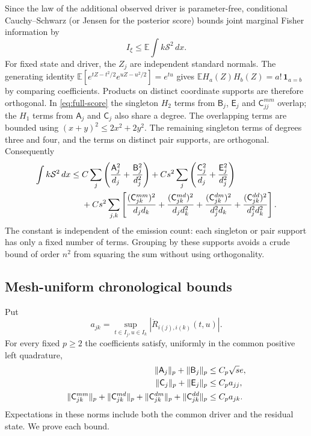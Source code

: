 \documentclass[11pt,a4paper]{amsart}
\theoremstyle{plain}
\theoremstyle{definition}
\theoremstyle{remark}
\newcommand{\EE}{\mathbb{E}}
\begin{document}
Since the law of the additional observed driver is parameter-free,
conditional Cauchy--Schwarz (or Jensen for the posterior score) bounds joint marginal Fisher
information by
\begin{equation}\label{eq:score-Jensen}
 I_\xi\le\EE\int k\mathcal S^2\,dx.
\end{equation}
For fixed state and driver, the $Z_j$ are independent standard normals.
The generating identity
$\EE[e^{tZ-t^2/2}e^{uZ-u^2/2}]=e^{tu}$ gives
$\EE H_a(Z)H_b(Z)=a!\,\mathbf1_{a=b}$ by comparing coefficients.
Products on distinct coordinate supports are therefore orthogonal.
In \eqref{eq:full-score} the singleton $H_2$ terms from
$\mathsf B_j$, $\mathsf E_j$ and $\mathsf C^{mm}_{jj}$ overlap; the
$H_1$ terms from $\mathsf A_j$ and $\mathsf C_j$ also share a degree.
The overlapping terms are bounded using $(x+y)^2\le2x^2+2y^2$.
The remaining singleton terms of degrees three and four, and the terms
on distinct pair supports, are orthogonal.
Consequently
\begin{align}\label{eq:score-norm}
 \int k\mathcal S^2\,dx\le{}&
 C\sum_j\left(\frac{\mathsf A_j^2}{d_j}
                         +\frac{\mathsf B_j^2}{d_j^2}\right)
 +Cs^2\sum_j\left(\frac{\mathsf C_j^2}{d_j}
                         +\frac{\mathsf E_j^2}{d_j^2}\right)\notag\\
 &+Cs^2\sum_{j,k}\left[
 \frac{(\mathsf C^{mm}_{jk})^2}{d_jd_k}
 +\frac{(\mathsf C^{md}_{jk})^2}{d_jd_k^2}
 +\frac{(\mathsf C^{dm}_{jk})^2}{d_j^2d_k}
 +\frac{(\mathsf C^{dd}_{jk})^2}{d_j^2d_k^2}\right].
\end{align}
The constant is independent of the emission count: each singleton or pair
support has only a fixed number of terms. Grouping by these supports avoids
a crude bound of order $n^2$ from squaring the sum without using
orthogonality.

\subsection{Mesh-uniform chronological bounds}

Put
\[
 a_{jk}=\sup_{t\in I_j,u\in I_k}
                  |\dot R_{i(j),i(k)}(t,u)|.
\]
For every fixed $p\ge2$ the coefficients satisfy, uniformly in the common
positive left quadrature,
\begin{align}\label{eq:coefficient-bounds}
 \|\mathsf A_j\|_p+\|\mathsf B_j\|_p&\le C_p\sqrt{s}e,\notag\\
 \|\mathsf C_j\|_p+\|\mathsf E_j\|_p&\le C_pa_{jj},\notag\\
 \|\mathsf C^{mm}_{jk}\|_p+\|\mathsf C^{md}_{jk}\|_p
 +\|\mathsf C^{dm}_{jk}\|_p+\|\mathsf C^{dd}_{jk}\|_p
                                      &\le C_pa_{jk}.
\end{align}
Expectations in these norms include both the common driver and the residual
state. We prove each bound.
\end{document}
